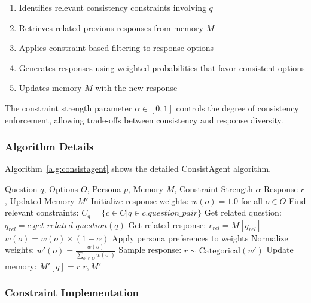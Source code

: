 \documentclass[sigconf, anonymous]{acmart}
\begin{document}
\begin{enumerate}
    \item Identifies relevant consistency constraints involving $q$
    \item Retrieves related previous responses from memory $M$
    \item Applies constraint-based filtering to response options
    \item Generates responses using weighted probabilities that favor consistent options
    \item Updates memory $M$ with the new response
\end{enumerate}

The constraint strength parameter $\alpha \in [0,1]$ controls the degree of consistency enforcement, allowing trade-offs between consistency and response diversity.

\subsubsection{Algorithm Details}

Algorithm~\ref{alg:consistagent} shows the detailed ConsistAgent algorithm.

\begin{algorithm}[h]
\caption{ConsistAgent Algorithm}
\label{alg:consistagent}
\begin{algorithmic}[1]
\REQUIRE Question $q$, Options $O$, Persona $p$, Memory $M$, Constraint Strength $\alpha$
\ENSURE Response $r$, Updated Memory $M'$
\STATE Initialize response weights: $w(o) = 1.0$ for all $o \in O$
\STATE Find relevant constraints: $C_q = \{c \in C | q \in c.question\_pair\}$
    \STATE Get related question: $q_{rel} = c.get\_related\_question(q)$
        \STATE Get related response: $r_{rel} = M[q_{rel}]$
                \STATE $w(o) = w(o) \times (1 - \alpha)$
            \ENDIF
        \ENDFOR
    \ENDIF
\ENDFOR
\STATE Apply persona preferences to weights
\STATE Normalize weights: $w'(o) = \frac{w(o)}{\sum_{o' \in O} w(o')}$
\STATE Sample response: $r \sim \text{Categorical}(w')$
\STATE Update memory: $M'[q] = r$
\RETURN $r, M'$
\end{algorithmic}
\end{algorithm}

\subsubsection{Constraint Implementation}
\end{document}
